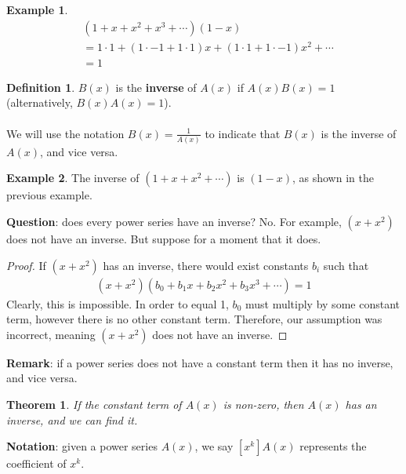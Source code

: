 \documentclass[]{article}
\newtheorem*{theorem}{Theorem}
\theoremstyle{definition}
\newtheorem*{defn}{Definition}
\newtheorem{ex}{Example}[section]
\begin{document}
			\begin{ex}
				\begin{align*}
					&(1 + x + x^2 + x^3 + \cdots)(1 - x) \\
					&= 1 \cdot 1 + (1 \cdot -1 + 1 \cdot 1)x + (1 \cdot 1 + 1 \cdot -1)x^2 + \cdots \\
					& = 1
				\end{align*}
			\end{ex}

			\begin{defn}
				$B(x)$ is the \textbf{inverse} of $A(x)$ if $A(x)B(x) = 1$ (alternatively, $B(x)A(x) = 1$).
				\\ \\
				We will use the notation $B(x) = \frac{1}{A(x)}$ to indicate that $B(x)$ is the inverse of $A(x)$, and vice versa. 
			\end{defn}

			\begin{ex}
				The inverse of $(1 + x + x^2 + \cdots)$ is $(1 - x)$, as shown in the previous example.
			\end{ex}

			\textbf{Question}: does every power series have an inverse? No. For example, $(x + x^2)$ does not have an inverse. But suppose for a moment that it does.
			\begin{proof}
				If $(x + x^2)$ has an inverse, there would exist constants $b_i$ such that
				\begin{align*}
					(x + x^2)(b_0 + b_1x + b_2x^2 + b_3x^3 + \cdots) = 1
				\end{align*}
				Clearly, this is impossible. In order to equal 1, $b_0$ must multiply by some constant term, however there is no other constant term. Therefore, our assumption was incorrect, meaning $(x + x^2)$ does not have an inverse.
			\end{proof}

			\textbf{Remark}: if a power series does not have a constant term then it has no inverse, and vice versa.
			\begin{theorem}
				If the constant term of $A(x)$ is non-zero, then $A(x)$ has an inverse, and we can find it.
			\end{theorem}

			\textbf{Notation}: given a power series $A(x)$, we say $[x^k]A(x)$ represents the coefficient of $x^k$.
\end{document}
